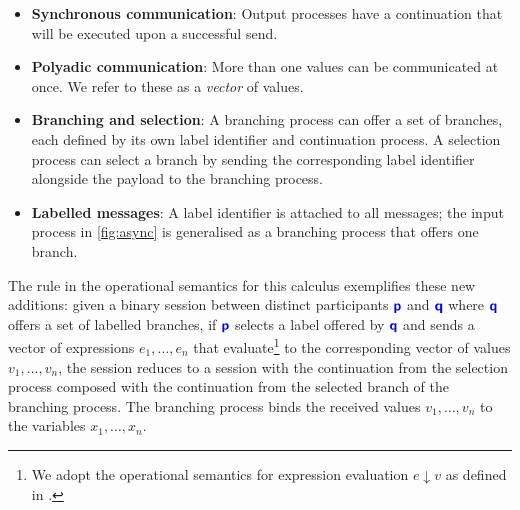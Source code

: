 \begin{itemize}
\item \textbf{Synchronous communication}: 
Output processes have a continuation that will be executed upon
a successful send.

\item \textbf{Polyadic communication}: 
More than one values can be communicated at once.
We refer to these as a \textit{vector} of values.

\item \textbf{Branching and selection}: 
A branching process can offer a set of branches, 
each defined by its own label identifier and continuation process. 
A selection process can select a branch by 
sending the corresponding label identifier 
alongside the payload to the branching process.

\item \textbf{Labelled messages}: 
A label identifier is attached to all messages; 
the input process in \cref{fig:async}
is generalised as a branching process that offers one branch.
\end{itemize}

The  rule in the operational semantics 
for this calculus exemplifies these new additions: 
given a binary session between distinct participants 
$\role{p}$ and $\role{q}$ 
where $\role{q}$ offers a set of labelled branches,
if $\role{p}$ selects a label offered by $\role{q}$ and 
sends a vector of expressions $e_1, \dots, e_n$ 
that evaluate\footnote{
We adopt the operational semantics for 
expression evaluation $e \downarrow v$ 
as defined in \cite{C406Lecture}.
} to the corresponding vector of values 
$v_1, \dots, v_n$, 
the session reduces to a session with 
the continuation from the selection process 
composed with the continuation from the selected branch 
of the branching process.
The branching process binds the received values
$v_1, \dots, v_n$ to the variables $x_1, \dots, x_n$.

\begin{prooftree}
\end{prooftree}

